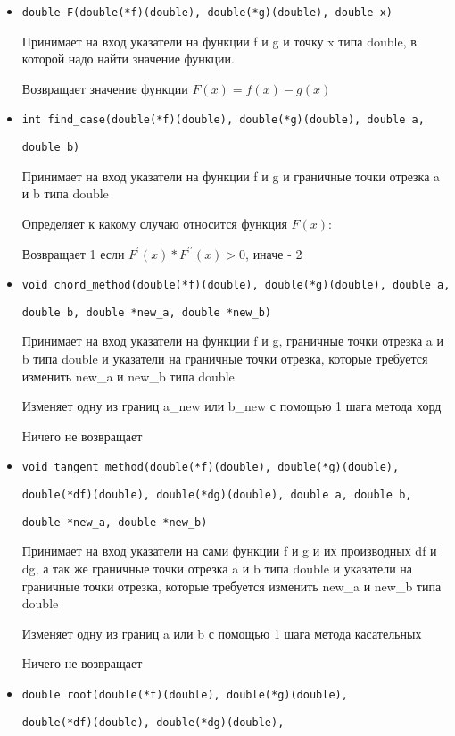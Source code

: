 \documentclass[a4paper,12pt,titlepage,finall]{article}
\begin{document}
\begin{itemize}
\item {\texttt{double F(double(*f)(double), double(*g)(double), double x)}}\par
Принимает на вход указатели на функции f и g и точку x типа double, в которой надо найти значение функции.\par
Возвращает значение функции $F(x) = f(x) - g(x)$
\item {\texttt{int find\_case(double(*f)(double), double(*g)(double), double a, } \par
\texttt{double b)}}\par
Принимает на вход указатели на функции f и g и граничные точки отрезка a и b типа double\par
Определяет к какому случаю относится функция $F(x)$: \par
Возвращает 1 если $F^\prime(x)*F^{\prime\prime}(x)>0$, иначе - 2
\item {\texttt{void chord\_method(double(*f)(double), double(*g)(double), double a,}\par
\texttt{double b, double *new\_a, double *new\_b)}} \par
Принимает на вход указатели на функции f и g, граничные точки отрезка a и b типа double и указатели на граничные точки отрезка, которые требуется изменить new\_a и  new\_b типа double\par
Изменяет одну из границ a\_new или b\_new с помощью 1 шага метода хорд\par
Ничего не возвращает\par
\item {\texttt{void tangent\_method(double(*f)(double), double(*g)(double),} \par
\texttt{double(*df)(double), double(*dg)(double), double a, double b, } \par
\texttt{double *new\_a, double *new\_b)}} \par
Принимает на вход указатели на сами функции f и g и их производных df и dg, а так же граничные точки отрезка a и b типа double и указатели на граничные точки отрезка, которые требуется изменить new\_a и  new\_b типа double\par
Изменяет одну из границ a или b с помощью 1 шага метода касательных\par
Ничего не возвращает
\item {\texttt{double root(double(*f)(double), double(*g)(double), } \par
\texttt{double(*df)(double), double(*dg)(double), } \par
}
\end{itemize}
\end{document}

